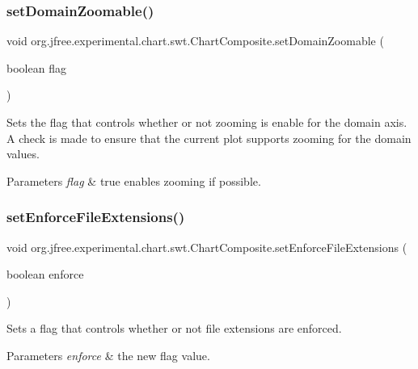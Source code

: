 \subsubsection{\texorpdfstring{set\+Domain\+Zoomable()}{setDomainZoomable()}}
{\footnotesize\ttfamily void org.\+jfree.\+experimental.\+chart.\+swt.\+Chart\+Composite.\+set\+Domain\+Zoomable (\begin{DoxyParamCaption}\item[{boolean}]{flag }\end{DoxyParamCaption})}

Sets the flag that controls whether or not zooming is enable for the domain axis. A check is made to ensure that the current plot supports zooming for the domain values.


\begin{DoxyParams}{Parameters}
{\em flag} & {\ttfamily true} enables zooming if possible. \\
\hline
\end{DoxyParams}
\mbox{\label{classorg_1_1jfree_1_1experimental_1_1chart_1_1swt_1_1_chart_composite_a0d18bc0ed9c74543ddbc9c829f0eaf95}} 
\subsubsection{\texorpdfstring{set\+Enforce\+File\+Extensions()}{setEnforceFileExtensions()}}
{\footnotesize\ttfamily void org.\+jfree.\+experimental.\+chart.\+swt.\+Chart\+Composite.\+set\+Enforce\+File\+Extensions (\begin{DoxyParamCaption}\item[{boolean}]{enforce }\end{DoxyParamCaption})}

Sets a flag that controls whether or not file extensions are enforced.


\begin{DoxyParams}{Parameters}
{\em enforce} & the new flag value. \\
\hline
\end{DoxyParams}
\mbox{\label{classorg_1_1jfree_1_1experimental_1_1chart_1_1swt_1_1_chart_composite_a080a377ded69975b8816ee57241569b7}} 
